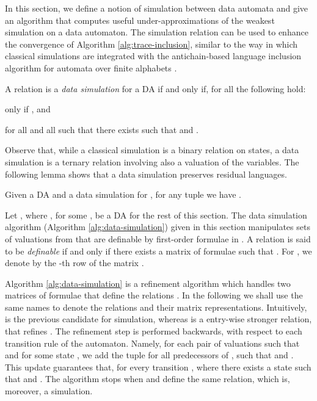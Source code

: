 \documentclass{llncs}
\begin{document}
In this section, we define a notion of simulation between data
automata and give an algorithm that computes useful
under-approximations of the weakest simulation on a data
automaton. The simulation relation can be used to enhance the
convergence of Algorithm \ref{alg:trace-inclusion}, similar to the way
in which classical simulations are integrated with the antichain-based
language inclusion algorithm for automata over finite alphabets
\cite{abdulla}.

\begin{definition}\label{def:data-simulation}
  A relation  is
  a \emph{data simulation} for a DA  if and only if, for all  the following hold: \begin{compactenum}
  \item\label{it1:data-simulation}  only if , and
\item\label{it2:data-simulation} for all  and all
     such that  there exists  such that
     and .
  \end{compactenum}
\end{definition}
Observe that, while a classical simulation is a binary relation on
states, a data simulation is a ternary relation involving also a
valuation of the variables. The following lemma shows that a data
simulation preserves residual languages.

\begin{lemma}\label{lemma:simulation-residual}
  Given a DA  and  a
  data simulation for , for any tuple  we have
  . 
\end{lemma}

Let ,
where , for some , be a DA for the rest
of this section. The data simulation algorithm (Algorithm
\ref{alg:data-simulation}) given in this section manipulates sets of
valuations from  that are definable by
first-order formulae in . A relation  is said to be \emph{definable} if and
only if there exists a matrix  of
formulae  such that . For , we denote by
 the -th row of the matrix .

Algorithm \ref{alg:data-simulation} is a refinement algorithm which
handles two matrices of formulae that define the relations
. In the following we shall use the
same names to denote the relations and their matrix representations.
Intuitively,  is the previous candidate for
simulation, whereas  is a entry-wise stronger relation,
that refines . The refinement step is performed
backwards, with respect to each transition rule  of the automaton. Namely, for each pair
of valuations such that  and
 for some state , we add
the tuple  for all predecessors 
of , such that  and . This update guarantees that, for every transition
, where  there exists a state  such that  and . The algorithm stops when  and
 define the same relation, which is, moreover, a
simulation.
\end{document}
